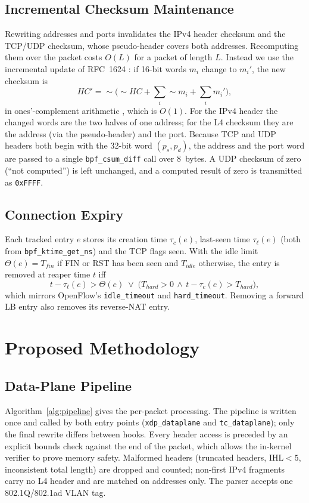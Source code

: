 \documentclass[conference]{IEEEtran}
\begin{document}
\subsection{Incremental Checksum Maintenance}
Rewriting addresses and ports invalidates the IPv4 header checksum and the
TCP/UDP checksum, whose pseudo-header covers both addresses. Recomputing them
over the packet costs $O(L)$ for a packet of length $L$. Instead we use the
incremental update of RFC~1624 \cite{rfc1624}: if 16-bit words $m_i$ change
to $m_i'$, the new checksum is
\begin{equation}
HC' = \sim\!\Big(\sim\!HC + \sum_i \sim m_i + \sum_i m_i'\Big),
\label{eq:csum}
\end{equation}
in ones'-complement arithmetic \cite{rfc1071}, which is $O(1)$. For the IPv4
header the changed words are the two halves of one address; for the L4
checksum they are the address (via the pseudo-header) and the port. Because
TCP and UDP headers both begin with the 32-bit word $(p_s,p_d)$, the address
and the port word are passed to a single \texttt{bpf\_csum\_diff} call over
8~bytes. A UDP checksum of zero (``not computed'') is left unchanged, and a
computed result of zero is transmitted as \texttt{0xFFFF}.

\subsection{Connection Expiry}
Each tracked entry $e$ stores its creation time $\tau_c(e)$, last-seen time
$\tau_\ell(e)$ (both from \texttt{bpf\_ktime\_get\_ns}) and the TCP flags seen.
With the idle limit
$\Theta(e) = T_{fin}$ if FIN or RST has been seen and $T_{idle}$ otherwise,
the entry is removed at reaper time $t$ iff
\begin{equation}
t - \tau_\ell(e) > \Theta(e)
\;\lor\; \big(T_{hard} > 0 \,\land\, t - \tau_c(e) > T_{hard}\big),
\label{eq:expiry}
\end{equation}
which mirrors OpenFlow's \texttt{idle\_timeout} and \texttt{hard\_timeout}.
Removing a forward LB entry also removes its reverse-NAT entry.

\section{Proposed Methodology}
\label{sec:method}
\subsection{Data-Plane Pipeline}
Algorithm~\ref{alg:pipeline} gives the per-packet processing. The pipeline is
written once and called by both entry points (\texttt{xdp\_dataplane} and
\texttt{tc\_dataplane}); only the final rewrite differs between hooks.
Every header access is preceded by an explicit bounds check against the end
of the packet, which allows the in-kernel verifier to prove memory safety.
Malformed headers (truncated headers, $\mathrm{IHL}<5$, inconsistent total
length) are dropped and counted; non-first IPv4 fragments carry no L4 header
and are matched on addresses only. The parser accepts one 802.1Q/802.1ad VLAN
tag.
\end{document}
